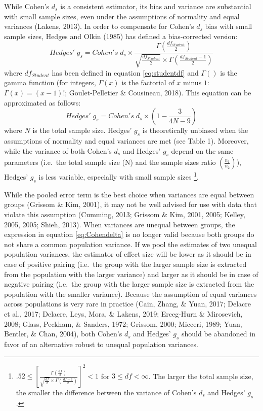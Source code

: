 \documentclass[
  english,
  man,floatsintext]{apa6}
\begin{document}
While Cohen's \(d_s\) is a consistent estimator, its bias and variance are substantial with small sample sizes, even under the assumptions of normality and equal variances (Lakens, 2013). In order to compensate for Cohen's \(d_s\) bias with small sample sizes, Hedges and Olkin (1985) has defined a bias-corrected version:
\begin{equation*} 
Hedges' \; g_s = Cohen's \; d_s \times \frac{\Gamma(\frac{df_{Student}}{2})}{\sqrt{\frac{df_{Student}}{2}} \times \Gamma(\frac{df_{Student}-1}{2})}
\label{eq:Hedgesgs}
\end{equation*}
where \(df_{Student}\) has been defined in equation \ref{eq:studentdf} and \(\Gamma()\) is the gamma function (for integers, \(\Gamma(x)\) is the factorial of \(x\) minus \(1\): \(\Gamma(x)=(x-1)!\); Goulet-Pelletier \& Cousineau, 2018). This equation can be approximated as follows:
\begin{equation*} 
Hedges' \; g_s = Cohen's \; d_s \times \left( 1- \frac{3}{4N -9} \right)
\label{eq:Hedgesgsapprox}
\end{equation*}
where \(N\) is the total sample size. Hedges' \(g_s\) is theoretically unbiased when the assumptions of normality and equal variances are met (see Table 1). Moreover, while the variance of both Cohen's \(d_s\) and Hedges' \(g_s\) depend on the same parameters (i.e.~the total sample size (N) and the sample sizes ratio \(\left(\frac{n_1}{n_2}\right)\)), Hedges' \(g_s\) is less variable, especially with small sample sizes \footnote{$.52 \le \left[\frac{\Gamma(\frac{df}{2})}{\sqrt{\frac{df}{2}} \times \Gamma(\frac{df-1}{2})} \right] ^2 < 1$ for $3 \le df < \infty$. The larger the total sample size, the smaller the difference between the variance of Cohen's $d_s$ and Hedges' $g_s$.}.

While the pooled error term is the best choice when variances are equal between groups (Grissom \& Kim, 2001), it may not be well advised for use with data that violate this assumption (Cumming, 2013; Grissom \& Kim, 2001, 2005; Kelley, 2005, 2005; Shieh, 2013). When variances are unequal between groups, the expression in equation \ref{eq:Cohendelta} is no longer valid because both groups do not share a common population variance. If we pool the estimates of two unequal population variances, the estimator of effect size will be lower as it should be in case of positive pairing (i.e.~the group with the larger sample size is extracted from the population with the larger variance) and larger as it should be in case of negative pairing (i.e.~the group with the larger sample size is extracted from the population with the smaller variance). Because the assumption of equal variances across populations is very rare in practice (Cain, Zhang, \& Yuan, 2017; Delacre et al., 2017; Delacre, Leys, Mora, \& Lakens, 2019; Erceg-Hurn \& Mirosevich, 2008; Glass, Peckham, \& Sanders, 1972; Grissom, 2000; Micceri, 1989; Yuan, Bentler, \& Chan, 2004), both Cohen's \(d_s\) and Hedges' \(g_s\) should be abandoned in favor of an alternative robust to unequal population variances.
\end{document}
